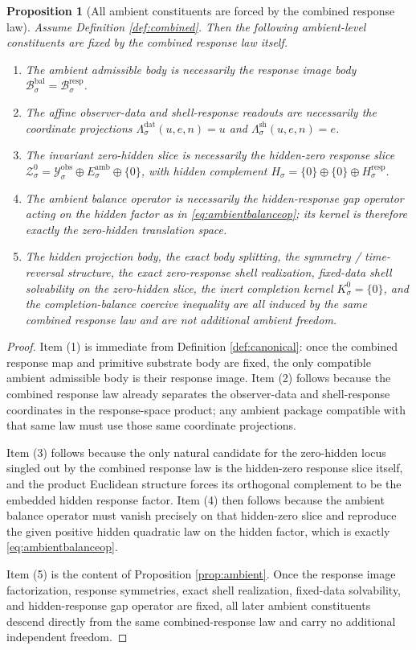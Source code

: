 \documentclass[11pt]{article}
\newcommand{\DataSpace}[1]{\mathcal Y_{#1}^{\mathrm{obs}}}
\newcommand{\AmbientTarget}[1]{E_{#1}^{\mathrm{amb}}}
\newcommand{\BalBody}[1]{\mathcal B_{#1}^{\mathrm{bal}}}
\newcommand{\BalData}[1]{\Lambda_{#1}^{\mathrm{dat}}}
\newcommand{\BalShell}[1]{\Lambda_{#1}^{\mathrm{sh}}}
\newcommand{\ZeroHiddenSlice}[1]{\mathcal Z_{#1}^{0}}
\newcommand{\Kernel}[1]{K_{#1}^{0}}
\newcommand{\GapSpace}[1]{H_{#1}}
\newcommand{\ResponseImage}[1]{\mathcal B_{#1}^{\mathrm{resp}}}
\newcommand{\RespGapSpace}[1]{H_{#1}^{\mathrm{resp}}}
\newtheorem{proposition}{Proposition}
\begin{document}
\begin{proposition}[All ambient constituents are forced by the combined response law]
\label{prop:forced}
Assume Definition \ref{def:combined}. Then the following ambient-level constituents are fixed by the combined response law itself.
\begin{enumerate}
    \item The ambient admissible body is necessarily the response image body \(\BalBody{\sigma}=\ResponseImage{\sigma}\).
    \item The affine observer-data and shell-response readouts are necessarily the coordinate projections \(\BalData{\sigma}(u,e,n)=u\) and \(\BalShell{\sigma}(u,e,n)=e\).
    \item The invariant zero-hidden slice is necessarily the hidden-zero response slice \(\ZeroHiddenSlice{\sigma}=\DataSpace{\sigma}\oplus\AmbientTarget{\sigma}\oplus\{0\}\), with hidden complement \(\GapSpace{\sigma}=\{0\}\oplus\{0\}\oplus\RespGapSpace{\sigma}\).
    \item The ambient balance operator is necessarily the hidden-response gap operator acting on the hidden factor as in \eqref{eq:ambientbalanceop}; its kernel is therefore exactly the zero-hidden translation space.
    \item The hidden projection body, the exact body splitting, the symmetry / time-reversal structure, the exact zero-response shell realization, fixed-data shell solvability on the zero-hidden slice, the inert completion kernel \(\Kernel{\sigma}=\{0\}\), and the completion-balance coercive inequality are all induced by the same combined response law and are not additional ambient freedom.
\end{enumerate}
\end{proposition}

\begin{proof}
Item (1) is immediate from Definition \ref{def:canonical}: once the combined response map and primitive substrate body are fixed, the only compatible ambient admissible body is their response image. Item (2) follows because the combined response law already separates the observer-data and shell-response coordinates in the response-space product; any ambient package compatible with that same law must use those same coordinate projections.

Item (3) follows because the only natural candidate for the zero-hidden locus singled out by the combined response law is the hidden-zero response slice itself, and the product Euclidean structure forces its orthogonal complement to be the embedded hidden response factor. Item (4) then follows because the ambient balance operator must vanish precisely on that hidden-zero slice and reproduce the given positive hidden quadratic law on the hidden factor, which is exactly \eqref{eq:ambientbalanceop}.

Item (5) is the content of Proposition \ref{prop:ambient}. Once the response image factorization, response symmetries, exact shell realization, fixed-data solvability, and hidden-response gap operator are fixed, all later ambient constituents descend directly from the same combined-response law and carry no additional independent freedom.
\end{proof}
\end{document}
